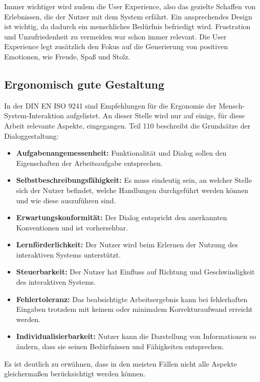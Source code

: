 Immer wichtiger wird zudem die User Experience, also das gezielte Schaffen von Erlebnissen, die der Nutzer mit dem System erfährt. Ein ansprechendes Design ist wichtig, da dadurch ein menschliches Bedürfnis befriedigt wird. Frustration und Unzufriedenheit zu vermeiden war schon immer relevant.  Die User Experience legt zusätzlich den Fokus auf die Generierung von positiven Emotionen, wie Freude, Spaß und Stolz. \cite{Hassenzahl2006}

\subsection{Ergonomisch gute Gestaltung}
\label{2:ergonomische-Gestaltung}
In der DIN EN ISO 9241 sind Empfehlungen für die Ergonomie der Mensch-System-Interaktion aufgelistet. An dieser Stelle wird nur auf einige, für diese Arbeit relevante Aspekte, eingegangen. Teil 110 \cite{ISO9241-110} beschreibt die Grundsätze der Dialoggestaltung:
\begin{itemize}
\item \textbf{Aufgabenangemessenheit:} Funktionalität und Dialog sollen den Eigenschaften der Arbeitsaufgabe entsprechen.
\item \textbf{Selbstbeschreibungsfähigkeit:}  Es muss eindeutig sein, an welcher Stelle sich der Nutzer befindet, welche Handlungen durchgeführt werden können und wie diese auszuführen sind.
\item \textbf{Erwartungskonformität:} Der Dialog entspricht den anerkannten Konventionen und ist vorhersehbar.
\item \textbf{Lernförderlichkeit:} Der Nutzer wird beim Erlernen der Nutzung des interaktiven Systems unterstützt.
\item \textbf{Steuerbarkeit:} Der Nutzer hat Einfluss auf Richtung und Geschwindigkeit des interaktiven Systems.
\item \textbf{Fehlertoleranz:} Das beabsichtigte Arbeitsergebnis kann bei fehlerhaften Eingaben trotzdem mit keinem oder minimalem Korrekturaufwand erreicht werden.
\item \textbf{Individualisierbarkeit:} Nutzer kann die Darstellung von Informationen so ändern, dass sie seinen Bedürfnissen und Fähigkeiten entsprechen.
\end{itemize}
Es ist deutlich zu erwähnen, dass in den meisten Fällen nicht alle Aspekte gleichermaßen berücksichtigt werden können.

